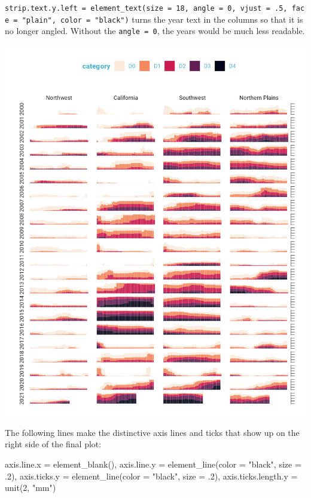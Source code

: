 \documentclass[
]{book}
\newenvironment{Shaded}{\begin{snugshade}}{\end{snugshade}}
\newcommand{\AttributeTok}[1]{\textcolor[rgb]{0.77,0.63,0.00}{#1}}
\newcommand{\DecValTok}[1]{\textcolor[rgb]{0.00,0.00,0.81}{#1}}
\newcommand{\FunctionTok}[1]{\textcolor[rgb]{0.00,0.00,0.00}{#1}}
\newcommand{\NormalTok}[1]{#1}
\newcommand{\OtherTok}[1]{\textcolor[rgb]{0.56,0.35,0.01}{#1}}
\newcommand{\StringTok}[1]{\textcolor[rgb]{0.31,0.60,0.02}{#1}}
\begin{document}
\texttt{strip.text.y.left\ =\ element\_text(size\ =\ 18,\ angle\ =\ 0,\ vjust\ =\ .5,\ face\ =\ "plain",\ color\ =\ "black")} turns the year text in the columns so that it is no longer angled. Without the \texttt{angle\ =\ 0}, the years would be much less readable.

\includegraphics[width=1\linewidth]{data-viz_files/figure-latex/unnamed-chunk-40-1}

The following lines make the distinctive axis lines and ticks that show up on the right side of the final plot:

\begin{Shaded}
\begin{Highlighting}[]
\NormalTok{axis.line.x }\OtherTok{=} \FunctionTok{element\_blank}\NormalTok{(),}
\NormalTok{axis.line.y }\OtherTok{=} \FunctionTok{element\_line}\NormalTok{(}\AttributeTok{color =} \StringTok{"black"}\NormalTok{, }\AttributeTok{size =}\NormalTok{ .}\DecValTok{2}\NormalTok{),}
\NormalTok{axis.ticks.y }\OtherTok{=} \FunctionTok{element\_line}\NormalTok{(}\AttributeTok{color =} \StringTok{"black"}\NormalTok{, }\AttributeTok{size =}\NormalTok{ .}\DecValTok{2}\NormalTok{),}
\NormalTok{axis.ticks.length.y }\OtherTok{=} \FunctionTok{unit}\NormalTok{(}\DecValTok{2}\NormalTok{, }\StringTok{"mm"}\NormalTok{)}
\end{Highlighting}
\end{Shaded}
\end{document}
